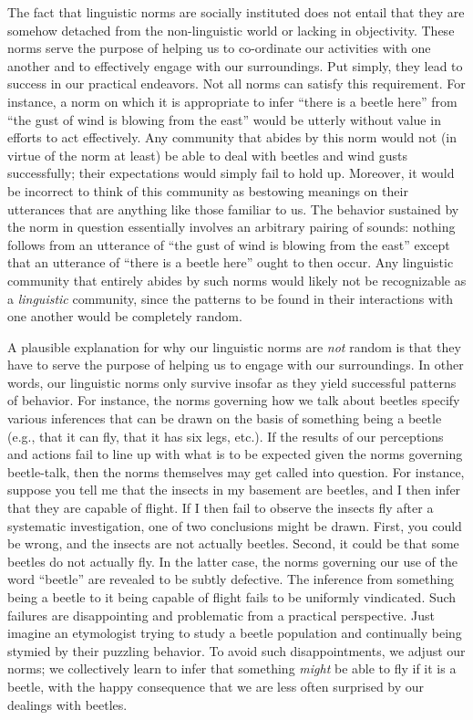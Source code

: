 The fact that linguistic norms are socially instituted does not entail that they are somehow detached from the non-linguistic world or lacking in objectivity. These norms serve the purpose of helping us to co-ordinate our activities with one another and to effectively engage with our surroundings. Put simply, they lead to success in our practical endeavors. Not all norms can satisfy this requirement. For instance, a norm on which it is appropriate to infer ``there is a beetle here'' from ``the gust of wind is blowing from the east'' would be utterly without value in efforts to act effectively. Any community that abides by this norm would not (in virtue of the norm at least) be able to deal with beetles and wind gusts successfully; their expectations would simply fail to hold up. Moreover, it would be incorrect to think of this community as bestowing meanings on their utterances that are anything like those familiar to us. The behavior sustained by the norm in question essentially involves an arbitrary pairing of sounds: nothing follows from an utterance of ``the gust of wind is blowing from the east'' except that an utterance of ``there is a beetle here'' ought to then occur. Any linguistic community that entirely abides by such norms would likely not be recognizable as a \textit{linguistic} community, since the patterns to be found in their interactions with one another would be completely random. 

A plausible explanation for why our linguistic norms are \textit{not} random is that they have to serve the purpose of helping us to engage with our surroundings. In other words, our linguistic norms only survive insofar as they yield successful patterns of behavior. For instance, the norms governing how we talk about beetles specify various inferences that can be drawn on the basis of something being a beetle (e.g., that it can fly, that it has six legs, etc.). If the results of our perceptions and actions fail to line up with what is to be expected given the norms governing beetle-talk, then the norms themselves may get called into question. For instance, suppose you tell me that the insects in my basement are beetles, and I then infer that they are capable of flight. If I then fail to observe the insects fly after a systematic investigation, one of two conclusions might be drawn. First, you could be wrong, and the insects are not actually beetles. Second, it could be that some beetles do not actually fly. In the latter case, the norms governing our use of the word ``beetle'' are revealed to be subtly defective. The inference from something being a beetle to it being capable of flight fails to be uniformly vindicated. Such failures are disappointing and problematic from a practical perspective. Just imagine an etymologist trying to study a beetle population and continually being stymied by their puzzling behavior. To avoid such disappointments, we adjust our norms; we collectively learn to infer that something \textit{might} be able to fly if it is a beetle, with the happy consequence that we are less often surprised by our dealings with beetles.

